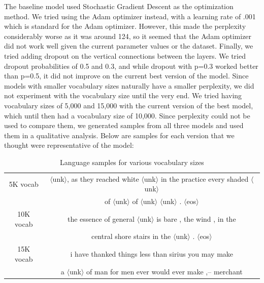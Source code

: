\documentclass[a4paper]{article}
\begin{document}
\newline
\newline
The baseline model used Stochastic Gradient Descent as the optimization method. We tried using the Adam optimizer instead, with a learning rate of .001 which is standard for the Adam optimizer. However, this made the perplexity considerably worse as it was around 124, so it seemed that the Adam optimizer did not work well given the current parameter values or the dataset. Finally, we tried adding dropout on the vertical connections between the layers. We tried dropout probabilities of 0.5 and 0.3, and while dropout with p=0.3 worked better than p=0.5, it did not improve on the current best version of the model. 
\newline
\newline
Since models with smaller vocabulary sizes naturally have a smaller perplexity, we did not experiment with the vocabulary size until the very end. We tried having vocabulary sizes of 5,000 and 15,000 with the current version of the best model, which until then had a vocabulary size of 10,000. Since perplexity could not be used to compare them, we generated samples from all three models and used them in a qualitative analysis.
Below are samples for each version that we thought were representative of the model:

\begin{table}[h]
\centering
\begin{tabular}{|c | c|} 
 \hline
 5K vocab & $\langle$unk$\rangle$, as they reached white $\langle$unk$\rangle$ in
the practice every shaded $\langle$unk$\rangle$  \\ & of $\langle$unk$\rangle$ of $\langle$unk$\rangle$ $\langle$unk$\rangle$ . $\langle$eos$\rangle$ \\ \hline
10K vocab & the
essence of general $\langle$unk$\rangle$ is bare , the wind , in the \\ & central shore stairs in the $\langle$unk$\rangle$ . $\langle$eos$\rangle$ \\ \hline
15K vocab & i have thanked things less than sirius you may make \\ & a $\langle$unk$\rangle$ of man for men ever would ever
make ,-- merchant \\ \hline
\end{tabular}
\caption{Language samples for various vocabulary sizes}
\label{table:1}
\end{table}
\end{document}
